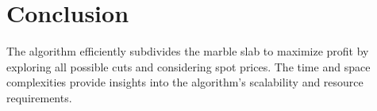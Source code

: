 \documentclass{article}
\begin{document}
\section{Conclusion}
The algorithm efficiently subdivides the marble slab to maximize profit by exploring all possible cuts and considering spot prices. The time and space complexities provide insights into the algorithm's scalability and resource requirements.
\end{document}
